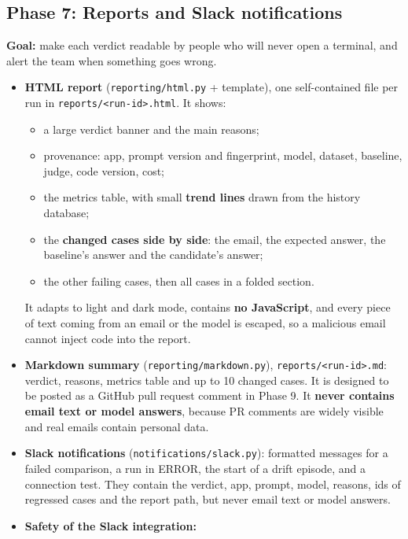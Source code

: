 \documentclass[11pt,a4paper]{article}
\newcommand{\code}[1]{\nolinkurl{#1}}
\begin{document}
\subsection{Phase 7: Reports and Slack notifications}
\textbf{Goal:} make each verdict readable by people who will never open a terminal, and alert
the team when something goes wrong.
\begin{itemize}
  \item \textbf{HTML report} (\code{reporting/html.py} + template), one self-contained file per
        run in \code{reports/<run-id>.html}. It shows:
        \begin{itemize}
          \item a large verdict banner and the main reasons;
          \item provenance: app, prompt version and fingerprint, model, dataset, baseline,
                judge, code version, cost;
          \item the metrics table, with small \textbf{trend lines} drawn from the history database;
          \item the \textbf{changed cases side by side}: the email, the expected answer, the
                baseline's answer and the candidate's answer;
          \item the other failing cases, then all cases in a folded section.
        \end{itemize}
        It adapts to light and dark mode, contains \textbf{no JavaScript}, and every piece of
        text coming from an email or the model is escaped, so a malicious email cannot inject
        code into the report.
  \item \textbf{Markdown summary} (\code{reporting/markdown.py}), \code{reports/<run-id>.md}:
        verdict, reasons, metrics table and up to 10 changed cases. It is designed to be posted
        as a GitHub pull request comment in Phase 9. It \textbf{never contains email text or
        model answers}, because PR comments are widely visible and real emails contain personal
        data.
  \item \textbf{Slack notifications} (\code{notifications/slack.py}): formatted messages for a
        failed comparison, a run in ERROR, the start of a drift episode, and a connection test.
        They contain the verdict, app, prompt, model, reasons, ids of regressed cases and the
        report path, but never email text or model answers.
  \item \textbf{Safety of the Slack integration:}
        \begin{itemize}

\end{itemize}
\end{itemize}
\end{document}
